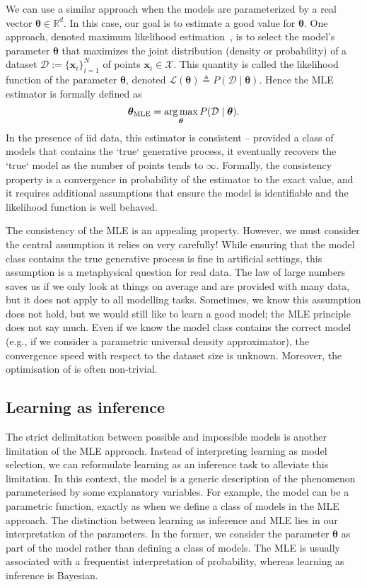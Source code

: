 We can use a similar approach when the models are parameterized by a real vector $\bm{\theta} \in \mathbb{R}^d$. In this case, our goal is to estimate a good value for $\bm{\theta}$. One approach, denoted maximum likelihood estimation~\citep[][MLE]{fisher1922mathematical}, is to select the model's parameter $\bm{\theta}$ that maximizes the joint distribution (density or probability) of a dataset $\mathcal{D}:=\{\mathbf{x}_i\}_{i=1}^N$ of points $\bm{x}_i \in \mathcal{X}$. This quantity is called the likelihood function of the parameter $\bm{\theta}$, denoted $\mathcal{L}(\bm{\theta}) \triangleq P(\mathcal{D}\mid\bm{\theta})$. Hence the MLE estimator is formally defined as
\begin{align}
   \bm{\theta}_{\text{MLE}} = \operatorname*{arg\,max}_{\bm{\theta}} P(\mathcal{D}\mid\bm{\theta}). \label{eq:chap02:MLE}
\end{align}
In the presence of iid data, this estimator is consistent -- provided a class of models that contains the `true` generative process, it eventually recovers the `true` model as the number of points tends to $\infty$. Formally, the consistency property is a convergence in probability of the estimator to the exact value, and it requires additional assumptions that ensure the model is identifiable and the likelihood function is well behaved. %

The consistency of the MLE is an appealing property. However, we must consider the central assumption it relies on very carefully! While ensuring that the model class contains the true generative process is fine in artificial settings, this assumption is a metaphysical question for real data. The law of large numbers saves us if we only look at things on average and are provided with many data, but it does not apply to all modelling tasks. Sometimes, we know this assumption does not hold, but we would still like to learn a good model; the MLE principle does not say much. Even if we know the model class contains the correct model (e.g., if we consider a parametric universal density approximator), the convergence speed with respect to the dataset size is unknown. Moreover, the optimisation of  is often non-trivial.


\subsection{Learning as inference}
The strict delimitation between possible and impossible models is another limitation of the MLE approach. Instead of interpreting learning as model selection, we can reformulate learning as an inference task to alleviate this limitation. In this context, the model is a generic description of the phenomenon parameterised by some explanatory variables. For example, the model can be a parametric function, exactly as when we define a class of models in the MLE approach. The distinction between learning as inference and MLE lies in our interpretation of the parameters. In the former, we consider the parameter $\bm \theta$ as part of the model rather than defining a class of models. The MLE is usually associated with a frequentist interpretation of probability, whereas learning as inference is Bayesian.

